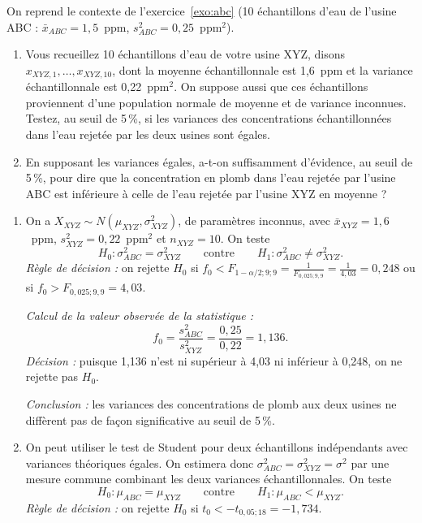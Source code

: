 \begin{exercice}
On reprend le contexte de l'exercice~\ref{exo:abc} (10 échantillons d'eau de
l'usine ABC : $\bar x_{ABC}=1,5$~ppm, $s^2_{ABC}=0,25$~ppm$^2$).
\begin{enumerate}[label=(\alph*)]
  \item Vous recueillez 10 échantillons d'eau de votre usine XYZ, disons
  $x_{XYZ,1},\dots,x_{XYZ,10}$, dont la moyenne échantillonnale est 1,6~ppm et la variance
  échantillonnale est 0,22~ppm$^2$. On suppose aussi que ces échantillons proviennent d'une
  population normale de moyenne et de variance inconnues. Testez, au seuil de 5\,\%, si les
  variances des concentrations échantillonnées dans l'eau rejetée par les deux usines sont
  égales.
  \item En supposant les variances égales, a-t-on suffisamment d'évidence, au seuil de
  5\,\%, pour dire que la concentration en plomb dans l'eau rejetée par l'usine ABC est
  inférieure à celle de l'eau rejetée par l'usine XYZ en moyenne ?
\end{enumerate}
\begin{solution}
\begin{enumerate}[label=(\alph*)]
  \item On a $X_{XYZ}\sim N(\mu_{XYZ},\sigma^2_{XYZ})$, de paramètres inconnus, avec
  $\bar x_{XYZ}=1,6$~ppm, $s^2_{XYZ}=0,22$~ppm$^2$ et $n_{XYZ}=10$. On teste
  \[
    H_0:\sigma^2_{ABC}=\sigma^2_{XYZ}\qquad\text{contre}\qquad
    H_1:\sigma^2_{ABC}\neq\sigma^2_{XYZ}.
  \]
  \emph{Règle de décision :} on rejette $H_0$ si
  $f_0<F_{1-\alpha/2;9;9}=\frac{1}{F_{0,025;9,9}}=\frac{1}{4,03}=0,248$ ou si
  $f_0>F_{0,025;9,9}=4,03$.

  \emph{Calcul de la valeur observée de la statistique :}
  \[
    f_0=\frac{s^2_{ABC}}{s^2_{XYZ}}=\frac{0,25}{0,22}=1,136.
  \]
  \emph{Décision :} puisque 1,136 n'est ni supérieur à 4,03 ni inférieur à 0,248, on ne
  rejette pas $H_0$.

  \emph{Conclusion :} les variances des concentrations de plomb aux deux usines ne diffèrent
  pas de façon significative au seuil de 5\,\%.
  \item On peut utiliser le test de Student pour deux échantillons indépendants avec
  variances théoriques égales. On estimera donc $\sigma^2_{ABC}=\sigma^2_{XYZ}=\sigma^2$
  par une mesure commune combinant les deux variances échantillonnales. On teste
  \[
    H_0:\mu_{ABC}=\mu_{XYZ}\qquad\text{contre}\qquad H_1:\mu_{ABC}<\mu_{XYZ}.
  \]
  \emph{Règle de décision :} on rejette $H_0$ si
  $t_0<-t_{0,05;18}=-1,734$.


\end{enumerate}
\end{solution}
\end{exercice}
